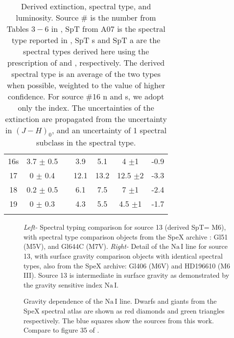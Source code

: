\begin{center}
{\begin{table}
\begin{tabular}{ccccccc}
16s	&	3.7	$\pm$	0.5	& &	3.9	&	5.1	&	4	$\pm$1	&	-0.9	\\
17	&	0	$\pm$	0.4	& &	12.1	&	13.2	&	12.5	$\pm$2	&	-3.3	\\
18	&	0.2	$\pm$	0.5	& &	6.1	&	7.5	&	7	$\pm$1	&	-2.4	\\
19	&	0	$\pm$	0.3	& &	4.3	&	5.5	&	4.5	$\pm$1	&	-1.7	\\
\noalign{\smallskip}
\hline
\end{tabular}
 \caption[Derived extinction, spectral type, and luminosity for Allers \emph{et al.} 2006 sources]{Derived extinction, spectral type, and luminosity.  Source \# is the number from Tables $3-6$ in \citet{allers06}, SpT from A07 is the spectral type reported in \citet{allers07}, SpT s and SpT a are the spectral types derived here using the prescription of \citet{slesnick04} and \citet{allers07}, respectively.  The derived spectral type is an average of the two types when possible, weighted to the value of higher confidence.  For source \#16 n and s, we adopt only the \citet{slesnick04} index.  The uncertainties of the extinction are propagated from the uncertainty in $(J-H)_{0}$, and an uncertainty of 1 spectral subclass in the spectral type.}
 \end{table}
}
\end{center}

\begin{figure}[!ht]
\caption[Spectral classification with spectral type standards and spectra of dwarfs and giants]{\emph{Left-} Spectral typing comparison for source 13 (derived SpT= M6), with spectral type comparison objects from the SpeX archive \citep{rayner09,cushing05}: Gl51 (M5V), and Gl644C (M7V).  \emph{Right-} Detail of the $\mathrm{Na\, I}$ line for source 13, with surface gravity comparison objects with identical spectral types, also from the SpeX archive: Gl406 (M6V) and HD196610 (M6 III).  Source 13 is intermediate in surface gravity as demonstrated by the gravity sensitive index $\mathrm{Na\, I}$.}
\end{figure}

\begin{figure}[!ht]
\caption[Gravity dependence of the $\mathrm{Na\, I}$ line]{Gravity dependence of the $\mathrm{Na\, I}$ line.  Dwarfs and giants from the SpeX spectral atlas are shown as red diamonds and green triangles respectively.  The blue squares show the sources from this work.  Compare to figure 35 of \citet{rayner09}.}
\end{figure}

